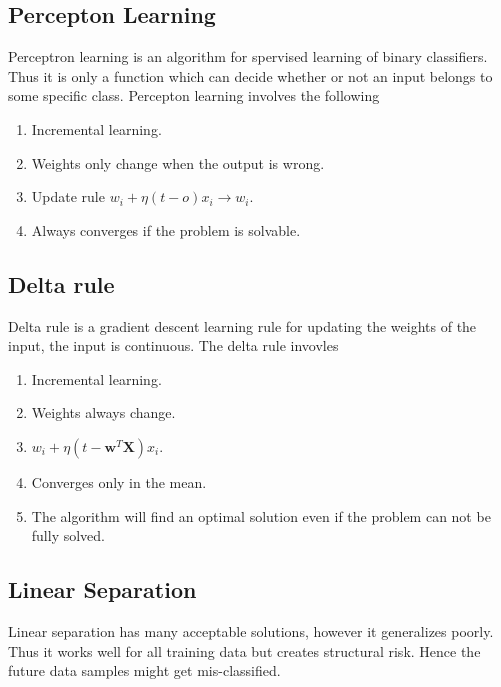 \documentclass[12pt]{article}
\numberwithin{equation}{section}
\begin{document}
\subsection{Percepton Learning}
Perceptron learning is an algorithm for spervised learning of binary classifiers. Thus it is only a function which can decide whether or not an input belongs to some specific class. Percepton learning involves the following
\begin{enumerate}
    \item Incremental learning.
    \item Weights only change when the output is wrong.
    \item Update rule $w_i + \eta (t-o)x_i \to w_i$.
    \item Always converges if the problem is solvable.
\end{enumerate}
\subsection{Delta rule}
Delta rule is a gradient descent learning rule for updating the weights of the input, the input is continuous. The delta rule invovles
\begin{enumerate}
    \item Incremental learning.
    \item Weights always change.
    \item $w_i + \eta (t-\bm{w}^T \bm{X})x_i$.
    \item Converges only in the mean.
    \item The algorithm will find an optimal solution even if the problem can not be fully solved.
\end{enumerate}
\subsection{Linear Separation}
Linear separation has many acceptable solutions, however it generalizes poorly. Thus it works well for all training data but creates structural risk. Hence the future data samples might get mis-classified. 
\end{document}
